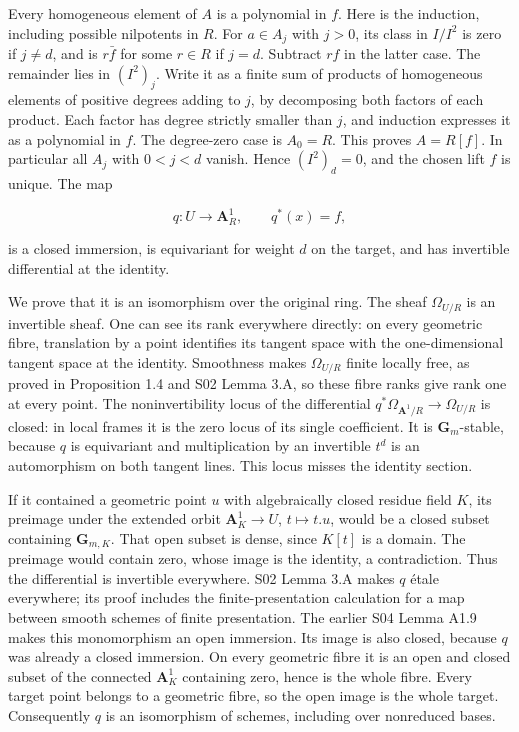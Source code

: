 \documentclass[11pt,a4paper,openany]{report}
\begin{document}
Every homogeneous element of \(A\) is a polynomial in \(f\). Here is the induction, including possible nilpotents in \(R\). For \(a\in A_j\) with \(j>0\), its class in \(I/I^2\) is zero if \(j\ne d\), and is \(r\bar f\) for some \(r\in R\) if \(j=d\). Subtract \(rf\) in the latter case. The remainder lies in \((I^2)_j\). Write it as a finite sum of products of homogeneous elements of positive degrees adding to \(j\), by decomposing both factors of each product. Each factor has degree strictly smaller than \(j\), and induction expresses it as a polynomial in \(f\). The degree-zero case is \(A_0=R\). This proves \(A=R[f]\). In particular all \(A_j\) with \(0<j<d\) vanish. Hence \((I^2)_d=0\), and the chosen lift \(f\) is unique. The map

\[
q:U\longrightarrow\mathbf A^1_R,\qquad q^*(x)=f,
\]

is a closed immersion, is equivariant for weight \(d\) on the target, and has invertible differential at the identity.

We prove that it is an isomorphism over the original ring. The sheaf \(\Omega_{U/R}\) is an invertible sheaf. One can see its rank everywhere directly: on every geometric fibre, translation by a point identifies its tangent space with the one-dimensional tangent space at the identity. Smoothness makes \(\Omega_{U/R}\) finite locally free, as proved in Proposition 1.4 and S02 Lemma 3.A, so these fibre ranks give rank one at every point. The noninvertibility locus of the differential \(q^*\Omega_{\mathbf A^1/R}\to\Omega_{U/R}\) is closed: in local frames it is the zero locus of its single coefficient. It is \(\mathbf G_m\)-stable, because \(q\) is equivariant and multiplication by an invertible \(t^d\) is an automorphism on both tangent lines. This locus misses the identity section.

If it contained a geometric point \(u\) with algebraically closed residue field \(K\), its preimage under the extended orbit \(\mathbf A^1_K\to U\), \(t\mapsto t.u\), would be a closed subset containing \(\mathbf G_{m,K}\). That open subset is dense, since \(K[t]\) is a domain. The preimage would contain zero, whose image is the identity, a contradiction. Thus the differential is invertible everywhere. S02 Lemma 3.A makes \(q\) étale everywhere; its proof includes the finite-presentation calculation for a map between smooth schemes of finite presentation. The earlier S04 Lemma A1.9 makes this monomorphism an open immersion. Its image is also closed, because \(q\) was already a closed immersion. On every geometric fibre it is an open and closed subset of the connected \(\mathbf A^1_K\) containing zero, hence is the whole fibre. Every target point belongs to a geometric fibre, so the open image is the whole target. Consequently \(q\) is an isomorphism of schemes, including over nonreduced bases.
\end{document}

